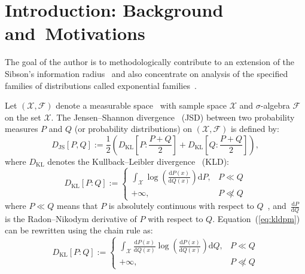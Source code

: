 \documentclass[entropy,article,accept,oneauthor,pdftex,entropy]{Definitions/mdpi}
\def\JS{\mathrm{JS}}
\def\KL{\mathrm{KL}}
\def\calF{\mathcal{F}}
\def\calX{\mathcal{X}}
\begin{document}
\section{Introduction: Background and~Motivations}

The goal of the author is to methodologically contribute to an extension of the Sibson's
information radius~\cite{Sibson-1969} and also concentrate on analysis of the specified families of distributions called exponential families~\cite{EF-2014}.

Let $(\calX,\calF)$ denote a measurable space~\cite{Billingsley-2008} with sample space $\calX$ and $\sigma$-algebra $\calF$ on the set $\calX$.
The Jensen--Shannon divergence~\cite{JS-1991} (JSD) between two probability measures $P$ and $Q$ (or probability distributions) on  $(\calX,\calF)$ is defined by:
\begin{equation}\label{eq:jsdpm}
D_\JS[P,Q] :=  \frac{1}{2}\left(D_\KL\left[P:\frac{P+Q}{2}\right]+D_\KL\left[Q:\frac{P+Q}{2}\right]\right),
\end{equation}
where $D_\KL$ denotes the Kullback--Leibler divergence~\cite{Kullback-1997,CoverThomasIT-2012} (KLD):
\begin{equation}\label{eq:kldpm}
D_\KL[P:Q] := 
\left\{
\begin{array}{ll}
\int_\calX \log\left(\frac{\mathrm{d}P(x)}{\mathrm{d}Q(x)}\right)\mathrm{d}P, & P\ll Q\\
+\infty,& P\not\ll Q
\end{array}
\right.
\end{equation}
where $P\ll Q$ means that $P$ is absolutely continuous with respect to $Q$~\cite{Billingsley-2008}, and~$\frac{\mathrm{d}P}{\mathrm{d}Q}$ is the Radon--Nikodym derivative of $P$ with respect to $Q$. 
Equation~(\ref{eq:kldpm}) can be rewritten using the chain rule as:
\begin{equation}\label{eq:kldpm2}
D_\KL[P:Q]:= 
\left\{
\begin{array}{ll}
\int_\calX  \frac{\mathrm{d}P(x)}{\mathrm{d}Q(x)}\log\left(\frac{\mathrm{d}P(x)}{\mathrm{d}Q(x)}\right) \mathrm{d}Q, & P\ll Q\\
+\infty, & P\not\ll Q
\end{array}
\right.
\end{equation}
 
\end{document}
